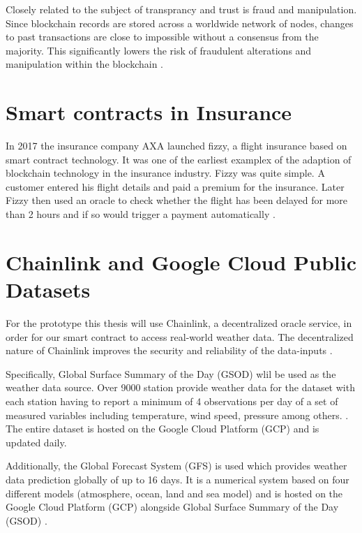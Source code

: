 Closely related to the subject of transprancy and trust is fraud and manipulation. Since blockchain records are stored across a worldwide network of nodes, changes to past transactions are close to impossible without a consensus from the majority. This significantly lowers the risk of fraudulent alterations and manipulation within the blockchain \autocite{eigelshoven2021cryptocurrency}. 

\section{Smart contracts in Insurance}\label{section:smart_contracts_insurance}

In 2017 the insurance company AXA launched fizzy, a flight insurance based on smart contract technology. It was one of the earliest examplex of the adaption of blockchain technology in the insurance industry. Fizzy was quite simple. A customer entered his flight details and paid a premium for the insurance. Later Fizzy then used an oracle to check whether the flight has been delayed for more than 2 hours and if so would trigger a payment automatically \autocite{hoffmann2021double}.

\section{Chainlink and Google Cloud Public Datasets}\label{section:chainlink_google_cloud_datasets}

For the prototype this thesis will use Chainlink, a decentralized oracle service, in order for our smart contract to access real-world weather data. The decentralized nature of Chainlink improves the security and reliability of the data-inputs \autocite{beniiche2020study}.

Specifically, Global Surface Summary of the Day (GSOD) wlil be used as the weather data source. Over 9000 station provide weather data for the dataset with each station having to report a minimum of 4 observations per day of a set of measured variables including temperature, wind speed, pressure among others. \autocite{NOAA_GSOD_2023}. The entire dataset is hosted on the Google Cloud Platform (GCP) and is updated daily.

Additionally, the Global Forecast System (GFS) is used which provides weather data prediction globally of up to 16 days. It is a numerical system based on four different models (atmosphere, ocean, land and sea model) and is hosted on the Google Cloud Platform (GCP) alongside Global Surface Summary of the Day (GSOD) \autocite{NOAA_GSOD_nd}.

